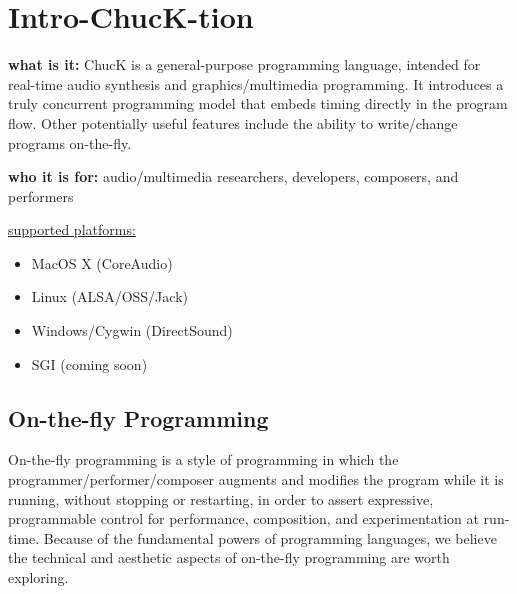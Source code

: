 \chapter{Intro-ChucK-tion} 

{\bf what is it:} ChucK is a general-purpose programming language, intended for 
real-time audio synthesis and graphics/multimedia programming.  It 
introduces a truly concurrent programming model that embeds timing 
directly in the program flow.  Other potentially useful features include 
the ability to write/change programs on-the-fly.

{\bf who it is for:} audio/multimedia researchers, developers, composers, and performers

\underline{supported platforms:}
\begin{itemize}
 \item MacOS X (CoreAudio)
 \item Linux (ALSA/OSS/Jack)
 \item Windows/Cygwin (DirectSound)
 \item SGI (coming soon)
\end{itemize}

\section*{On-the-fly Programming}
On-the-fly programming is a style of programming in which the programmer/performer/composer 
augments and modifies the program while it is running, without stopping or restarting, 
in order to assert expressive, programmable control for performance, composition, and 
experimentation at run-time. Because of the fundamental powers of programming languages, 
we believe the technical and aesthetic aspects of on-the-fly programming are worth exploring.